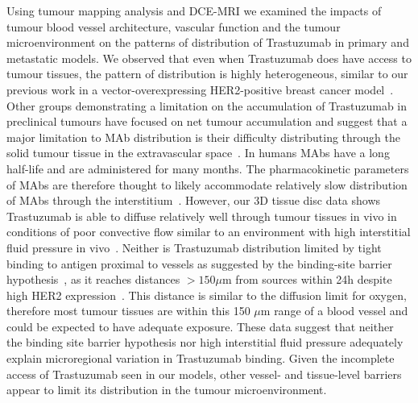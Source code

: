Using tumour mapping analysis and \acs{DCE-MRI} we examined the impacts of tumour blood vessel architecture, vascular function and the tumour microenvironment on the patterns of distribution of Trastuzumab in primary and metastatic models.
We observed that even when Trastuzumab does have access to tumour tissues, the pattern of distribution is highly heterogeneous, similar to our previous work in a vector-overexpressing \acs{HER2}-positive breast cancer model~\cite{Baker:2008ci}.
Other groups demonstrating a limitation on the accumulation of Trastuzumab in preclinical tumours have focused on net tumour accumulation and suggest that a major limitation to \acs{MAb} distribution is their difficulty distributing through the solid tumour tissue in the extravascular space~\cite{Jain:2010ie,Chauhan:2011fi,Lee:2010gb}.
In humans \acs{MAbs} have a long half-life and are administered for many months.
The pharmacokinetic parameters of \acs{MAbs} are therefore thought to likely accommodate relatively slow distribution of \acs{MAbs} through the interstitium~\cite{Chauhan:2011fi,Thurber:2012dd}.
However, our 3D tissue disc data shows Trastuzumab is able to diffuse relatively well through tumour tissues in vivo in conditions of poor convective flow similar to an environment with high interstitial fluid pressure in vivo~\cite{Baker:2018ex}.
Neither is Trastuzumab distribution limited by tight binding to antigen proximal to vessels as suggested by the binding-site barrier hypothesis~\cite{Juweid:1992ty}, as it reaches distances $>150 \mu$m from sources within 24h despite high \acs{HER2} expression~\cite{Baker:2018ex}.
This distance is similar to the diffusion limit for oxygen, therefore most tumour tissues are within this 150 $\mu$m range of a blood vessel and could be expected to have adequate exposure.
These data suggest that neither the binding site barrier hypothesis nor high interstitial fluid pressure adequately explain microregional variation in Trastuzumab binding.
Given the incomplete access of Trastuzumab seen in our models, other vessel- and tissue-level barriers appear to limit its distribution in the tumour microenvironment.

